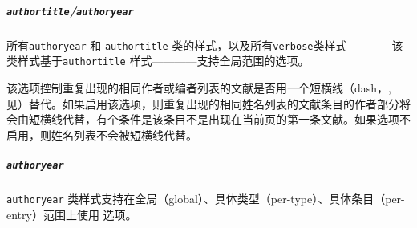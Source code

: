 
\subparagraph{\texttt{authortitle}/\texttt{authoryear}} 所有\texttt{authoryear} 和 \texttt{authortitle} 类的样式，以及所有\texttt{verbose}类样式————该类样式基于\texttt{authortitle} 样式————支持全局范围的选项。

\begin{optionlist}



该选项控制重复出现的相同作者或编者列表的文献是否用一个短横线（dash，, 见）替代。如果启用该选项，则重复出现的相同姓名列表的文献条目的作者部分将会由短横线代替，有个条件是该条目不是出现在当前页的第一条文献。如果选项不启用，则姓名列表不会被短横线代替。

\end{optionlist}


\subparagraph{\texttt{authoryear}} \texttt{authoryear} 类样式支持在全局（global）、具体类型（per-type）、具体条目（per-entry）范围上使用  选项。

